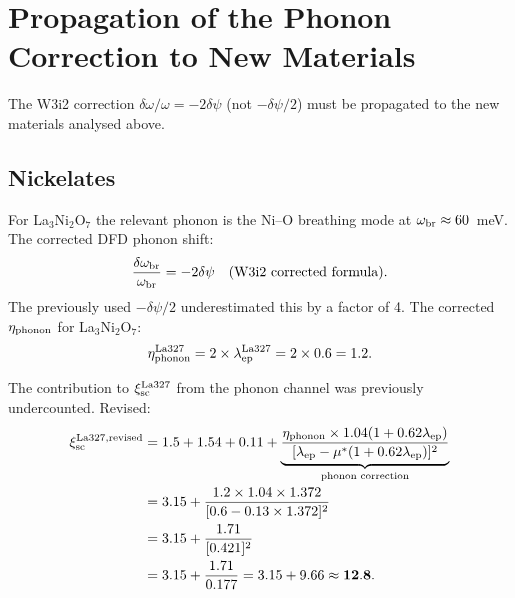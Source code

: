 \documentclass[11pt]{article}
\begin{document}
\section{Propagation of the Phonon Correction to New Materials}
\label{sec:phonon-correction}

The W3i2 correction $\delta\omega/\omega = -2\delta\psi$ (not $-\delta\psi/2$)
must be propagated to the new materials analysed above.

\subsection{Nickelates}

For La$_3$Ni$_2$O$_7$ the relevant phonon is the Ni--O breathing mode
at $\omega_{\rm br} \approx 60$~meV. The corrected DFD phonon shift:
\begin{equation}
\frac{\delta\omega_{\rm br}}{\omega_{\rm br}} = -2\delta\psi
\quad\text{(W3i2 corrected formula)}.
\label{eq:phonon-La327}
\end{equation}
The previously used $-\delta\psi/2$ underestimated this by a factor of 4.
The corrected $\eta_{\rm phonon}$ for La$_3$Ni$_2$O$_7$:
\begin{equation}
\eta_{\rm phonon}^{\rm La327} = 2 \times \lambda_{\rm ep}^{\rm La327}
= 2 \times 0.6 = 1.2.
\label{eq:eta-phonon-La327}
\end{equation}

The contribution to $\xi_{\rm sc}^{\rm La327}$ from the phonon channel
was previously undercounted. Revised:
\begin{align}
\xi_{\rm sc}^{\rm La327, revised}
&= 1.5 + 1.54 + 0.11 + \underbrace{\frac{\eta_{\rm phonon} \times 1.04(1+0.62\lambda_{\rm ep})}{[\lambda_{\rm ep}-\mu^*(1+0.62\lambda_{\rm ep})]^2}}_{\text{phonon correction}}
\notag\\
&= 3.15 + \frac{1.2 \times 1.04 \times 1.372}{[0.6-0.13\times1.372]^2}\notag\\
&= 3.15 + \frac{1.71}{[0.421]^2}\notag\\
&= 3.15 + \frac{1.71}{0.177}
= 3.15 + 9.66 \approx \mathbf{12.8}.
\label{eq:xi-La327-revised}
\end{align}
\end{document}
